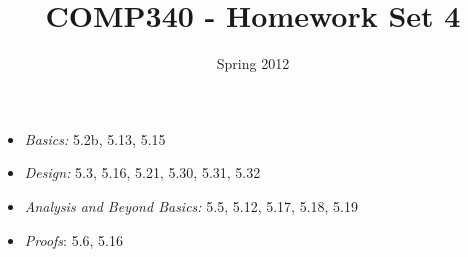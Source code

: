 \documentclass[10pt]{article}
\title{COMP340 - Homework Set 4}
\author{}
\date{ Spring 2012}
\begin{document}
\maketitle


\begin{itemize}
\item \textit{Basics:} 5.2b, 5.13, 5.15
\item \textit{Design:} 5.3, 5.16, 5.21, 5.30, 5.31, 5.32
\item \textit{Analysis and Beyond Basics:} 5.5, 5.12, 5.17, 5.18, 5.19
\item \textit{Proofs}: 5.6, 5.16
\end{itemize}
\end{document}
